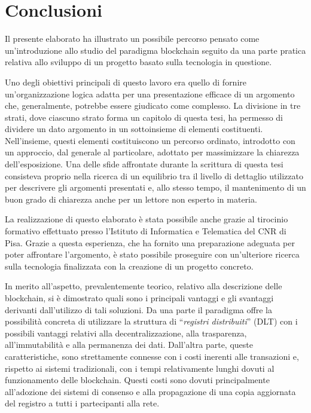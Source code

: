\chapter{Conclusioni}

Il presente elaborato ha illustrato un possibile percorso pensato come un’introduzione allo studio del paradigma blockchain seguito da una parte pratica relativa allo sviluppo di un progetto basato sulla tecnologia in questione.

Uno degli obiettivi principali di questo lavoro era quello di fornire un'organizzazione logica adatta per una presentazione efficace di un argomento che, generalmente, potrebbe essere giudicato come complesso. La divisione in tre strati, dove ciascuno strato forma un capitolo di questa tesi, ha permesso di dividere un dato argomento in un sottoinsieme di elementi costituenti. Nell’insieme, questi elementi costituiscono un percorso ordinato, introdotto con un approccio, dal generale al particolare, adottato per massimizzare la chiarezza dell’esposizione. Una delle sfide affrontate durante la scrittura di questa tesi consisteva proprio nella ricerca di un equilibrio tra il livello di dettaglio utilizzato per descrivere gli argomenti presentati e, allo stesso tempo, il mantenimento di un buon grado di chiarezza anche per un lettore non esperto in materia.

La realizzazione di questo elaborato è stata possibile anche grazie al tirocinio formativo effettuato presso l’Istituto di Informatica e Telematica del CNR di Pisa. Grazie a questa esperienza, che ha fornito una preparazione adeguata per poter affrontare l'argomento, è stato possibile proseguire con un’ulteriore ricerca sulla tecnologia finalizzata con la creazione di un progetto concreto.

In merito all'aspetto, prevalentemente teorico, relativo alla descrizione delle blockchain, si è dimostrato quali sono i principali vantaggi e gli svantaggi derivanti dall'utilizzo di tali soluzioni. Da una parte il paradigma offre la possibilità concreta di utilizzare la struttura di “\emph{registri distribuiti}” (DLT) con i possibili vantaggi relativi alla decentralizzazione, alla trasparenza, all'immutabilità e alla permanenza dei dati.
Dall'altra parte, queste caratteristiche, sono strettamente connesse con i costi inerenti alle transazioni e, rispetto ai sistemi tradizionali, con i tempi relativamente lunghi dovuti al funzionamento delle blockchain. Questi costi sono dovuti principalmente all'adozione dei sistemi di consenso e alla propagazione di una copia aggiornata del registro a tutti i partecipanti alla rete.

